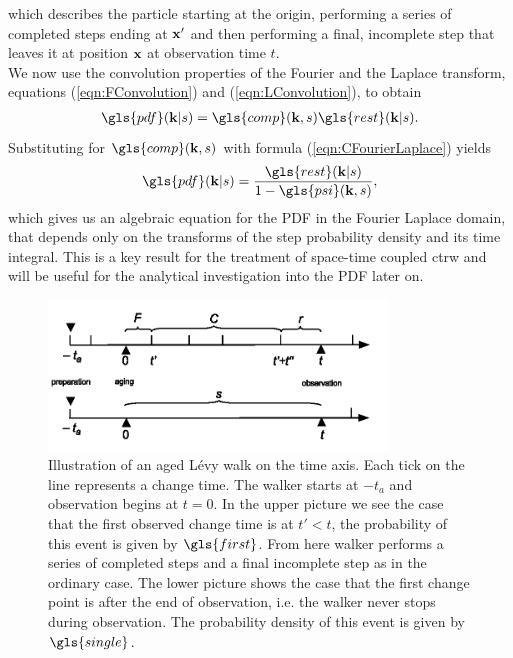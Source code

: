 %
which describes the particle starting at the origin, performing a series of completed steps ending at $\mathbf{ x' }$ and then performing a final, incomplete step that leaves it at position $\mathbf{ x }$ at observation time $t$.\\
We now use the convolution properties of the Fourier and the Laplace transform, equations (\ref{eqn:FConvolution}) and (\ref{eqn:LConvolution}), to obtain 
%
\begin{align}
\gls{pdf}(\ve{k}|s) = \gls{comp}(\ve{k},s) \gls{rest}(\ve{k}|s) \label{eqn:pdfFourierLaplaceI} .
\end{align}
%
Substituting for $\gls{comp}(\ve{k},s)$ with formula (\ref{eqn:CFourierLaplace}) yields
%
\begin{align}
\gls{pdf}(\ve{k}|s) = \frac{ \gls{rest}(\ve{k}|s)}{1 - \gls{psi}(\ve{k},s)} \label{eqn:pdfFourierLaplaceII} ,
\end{align}
%
which gives us an algebraic equation for the \gls{PDF} in the Fourier Laplace domain, that depends only on the transforms of the step probability density and its time integral. This is a key result for the treatment of space-time coupled \gls{ctrw} and will be useful for the analytical investigation into the \gls{PDF} later on.
%
\begin{figure}
\begin{center}
\includegraphics[width=90mm]{pics/timelineAged.png}
\caption{Illustration of an aged L\'evy walk on the time axis. Each tick on the line represents a change time. The walker starts at $-t_a$ and observation begins at $t=0$.  In the upper picture we see the case that the first observed change time is at $t'<t$, the probability of this event is given by $\gls{first}$. From here walker performs a series of completed steps and a final incomplete step as in the ordinary case. The lower picture shows the case that the first change point is after the end of observation, i.e. the walker never stops during observation. The probability density of this event is given by $\gls{single}$.
\label{fig:pdfAged}}
\end{center}
\end{figure}

